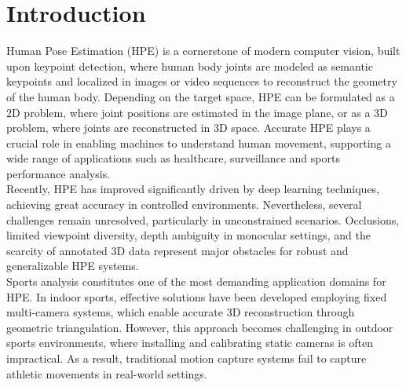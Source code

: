 \documentclass[11pt,a4paper,twocolumn]{article}
\begin{document}



\section{Introduction}
\label{sec:introduction}
Human Pose Estimation (HPE) is a cornerstone of modern computer vision, built upon keypoint detection, where human body joints are modeled as semantic keypoints and localized in 
images or video sequences to reconstruct the geometry of the human body.
Depending on the target space, HPE can be formulated as a 2D problem, where joint positions are estimated in the image plane, or as a 3D problem, where joints are reconstructed in 3D space. 
Accurate HPE plays a crucial role in enabling machines to understand human movement, supporting a wide range of applications such as healthcare, surveillance and sports performance analysis.\\
Recently, HPE has improved significantly driven by deep learning techniques, achieving great accuracy in controlled environments. Nevertheless, several challenges remain unresolved, particularly in 
unconstrained scenarios. Occlusions, limited viewpoint diversity, depth ambiguity in monocular settings, and the scarcity of annotated 3D data represent major obstacles for robust and generalizable HPE systems.\\
Sports analysis constitutes one of the most demanding application domains for HPE. In indoor sports, effective solutions have been developed employing fixed multi-camera systems, which enable accurate 3D reconstruction 
through geometric triangulation. However, this approach becomes challenging in outdoor sports environments, where installing and calibrating static cameras is often impractical. 
As a result, traditional motion capture systems fail to capture athletic movements in real-world settings.\\
\end{document}

